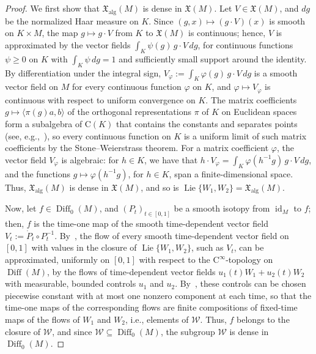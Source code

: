 \documentclass{article}
\newcommand{\xalg}{\mathfrak X_{\mathrm{alg}}}
\theoremstyle{definition}
\theoremstyle{plain}
\begin{document}
\begin{proof}
We first show that $\xalg(M)$ is dense in $\mathfrak X(M)$.
Let $V\in\mathfrak X(M)$, and $dg$ be the normalized Haar measure on $K$.
Since $(g,x)\mapsto(g\cdot V)(x)$ is smooth on $K\times M$, the map $g\mapsto g\cdot V$ from $K$ to $\mathfrak X(M)$ is continuous; hence, $V$ is approximated by the vector fields $\int_K\psi(g)\,g\cdot V\,dg$, for continuous functions $\psi\geq0$ on $K$ with $\int_K\psi\,dg=1$ and sufficiently small support around the identity.
By differentiation under the integral sign, $V_\varphi:=\int_K\varphi(g)\,g\cdot V\,dg$ is a smooth vector field on $M$ for every continuous function $\varphi$ on $K$, and $\varphi\mapsto V_\varphi$ is continuous with respect to uniform convergence on $K$.
The matrix coefficients $g\mapsto\langle\pi(g)a,b\rangle$ of the orthogonal representations $\pi$ of $K$ on Euclidean spaces form a subalgebra of $\mathrm{C}(K)$ that contains the constants and separates points (see, e.g.,~\cite[Chapter~III]{BtD}), so every continuous function on $K$ is a uniform limit of such matrix coefficients by the Stone--Weierstrass theorem.
For a matrix coefficient $\varphi$, the vector field $V_\varphi$ is algebraic: for $h\in K$, we have that $h\cdot V_\varphi=\int_K\varphi(h^{-1}g)\,g\cdot V\,dg$, and the functions $g\mapsto\varphi(h^{-1}g)$, for $h\in K$, span a finite-dimensional space.
Thus, $\xalg(M)$ is dense in $\mathfrak X(M)$, and so is $\operatorname{Lie}\{W_1,W_2\}=\xalg(M)$.

Now, let $f\in\operatorname{Diff}_0(M)$, and $(P_t)_{t\in[0,1]}$ be a smooth isotopy from $\operatorname{id}_M$ to $f$; then, $f$ is the time-one map of the smooth time-dependent vector field $V_t:=\dot P_t\circ P_t^{-1}$.
By~\cite[Theorem~1]{AK26}, the flow of every smooth time-dependent vector field on $[0,1]$ with values in the closure of $\operatorname{Lie}\{W_1,W_2\}$, such as $V_t$, can be approximated, uniformly on $[0,1]$ with respect to the $\mathrm{C}^\infty$-topology on $\operatorname{Diff}(M)$, by the flows of time-dependent vector fields $u_1(t)W_1+u_2(t)W_2$ with measurable, bounded controls $u_1$ and $u_2$.
By~\cite[Remark~1]{AK26}, these controls can be chosen piecewise constant with at most one nonzero component at each time, so that the time-one maps of the corresponding flows are finite compositions of fixed-time maps of the flows of $W_1$ and $W_2$, i.e., elements of $\mathcal W$.
Thus, $f$ belongs to the closure of $\mathcal W$, and since $\mathcal W\subseteq\operatorname{Diff}_0(M)$, the subgroup $\mathcal W$ is dense in $\operatorname{Diff}_0(M)$.
\end{proof}
\end{document}
